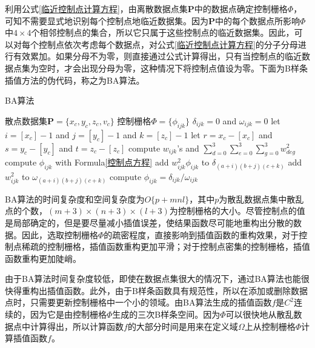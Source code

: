 利用公式\ref{临近控制点计算方程}，由离散数据点集$ \mathbf{P} $中的数据点确定控制栅格$ \Phi $，可知不需要显式地识别每个控制点地临近数据集。因为$ \mathbf{P} $中的每个数据点所影响$ \Phi $中$ 4 \times 4 $个相邻控制点的集合，所以它只属于这些控制点的临近数据集。因此，可以对每个控制点依次考虑每个数据点，对公式\ref{临近控制点计算方程}的分子分母进行有效累加。如果分母不为零，则直接通过公式计算得出，只有当控制点的临近数据点集为空时，才会出现分母为零，这种情况下将控制点值设为零。下面为B样条插值方法的伪代码，称之为BA算法。
\begin{algorithm}[h]
    \caption{BA算法}
    \begin{algorithmic}[1] %
        \Require 散点数据集$ \mathbf{P} = \{ x_{c}, y_{c}, z_{c}, v_{c} \} $
        \Ensure 控制栅格$ \Phi = \{ \phi_{ijk} \} $
        \State $ \delta_{ijk} = 0 $ and $ \omega_{ijk} = 0 $
        \EndFor
        \State let $ i = \left[ x_{c} \right] - 1 $ and $ j = \left[ y_{c} \right] - 1 $ and $ k = \left[ z_{c} \right] - 1 $
        \State let $ r = x_{c} - \left[ x_{c} \right] $ and $ s = y_{c} - \left[ y_{c} \right] $ and $ t = z_{c} - \left[ z_{c} \right] $
        \State compute $ w_{ijk} $'s and $ \sum_{d=0}^{3}\sum_{e=0}^{3}\sum_{g=0}^{3}w_{deg}^{2} $
        \State compute $ \phi_{ijk} $ with Formula\ref{控制点方程}
        \State add $ w_{ijk}^{2}\phi_{ijk} $ to $ \delta_{\left( a+i \right)\left( b+j \right)\left( c+k \right)} $
        \State add $ w_{ijk}^{2} $ to $ \omega_{\left( a+i \right)\left( b+j \right)\left( c+k \right)} $
        \EndFor
        \EndFor
        \State compute $ \phi_{ijk} = \delta_{ijk} / \omega_{ijk} $
        \EndIf
        \EndFor
    \end{algorithmic}
\end{algorithm}

BA算法的时间复杂度和空间复杂度为$ O\{ p + mnl \} $，其中$ p $为散乱数据点集中散乱点的个数，$ \left( m+3 \right) \times \left( n+3 \right) \times \left( l+3 \right) $为控制栅格的大小。尽管控制点的值是局部确定的，但是要尽量减小插值误差，使结果函数尽可能地重构出分散的数据。因此，选取控制栅格$ \Phi $的疏密程度，直接影响到插值函数的重构效果，对于控制点稀疏的控制栅格，插值函数重构更加平滑；对于控制点密集的控制栅格，插值函数重构更加陡峭。

由于BA算法时间复杂度较低，即使在数据点集很大的情况下，通过BA算法也能很快得重构出插值函数。此外，由于B样条函数具有规范性，所以在添加或删除数据点时，只需要更新控制栅格中一个小的领域。由BA算法生成的插值函数$ f $是$C^{2}$连续的，因为它是由控制栅格$ \Phi $生成的三次B样条空间。因为$ \Phi $可以很快地从散乱数据点中计算得出，所以计算函数$ f $的大部分时间是用来在定义域$ \Omega $上从控制栅格$ \Phi $计算插值函数$ f $。

